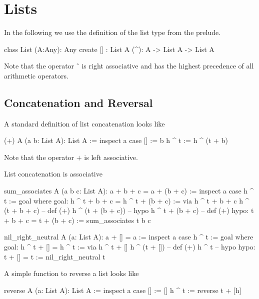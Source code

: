 \newpage
\section{Lists}
\label{sec:certprog-lists}


In the following we use the definition of the list type from the prelude.

\begin{alba}
  class
    List (A:Any): Any
  create
    [] : List A
    (^): A -> List A -> List A
\end{alba}
%
Note that the operator $\mathrel{\hat{\ }}$ is right associative and has the
highest precedence of all arithmetic operators.



\subsection{Concatenation and Reversal}


A standard definition of list concatenation looks like

\begin{alba}
  (+) A (a b: List A): List A :=
    inspect a case
      [] :=
        b
      h ^ t :=
        h ^ (t + b)
\end{alba}
Note that the operator $+$ is left associative.


List concatenation is associative
%
\begin{alba}
  sum_associates A (a b c: List A): a + b + c = a + (b + c) :=
    inspect a case
      h ^ t :=
        goal where
          goal: h ^ t + b + c = h ^ t + (b + c) :=
            via
               h ^ t + b + c
               h ^ (t + b + c)      -- def (+)
               h ^ (t + (b + c))    -- hypo
               h ^ t + (b + c)      -- def (+)
          hypo: t + b + c = t + (b + c) :=
            sum_associates t b c
\end{alba}


\begin{alba}
  nil_right_neutral A (a: List A): a + [] = a :=
    inspect a case
      h ^ t :=
        goal where
          goal: h ^ t + [] = h ^ t :=
            via
              h ^ t + []
              h ^ (t + [])   -- def (+)
              h ^ t          -- hypo
          hypo: t + [] = t :=
            nil_right_neutral t
\end{alba}


A simple function to reverse a list looks like

\begin{alba}
  reverse A (a: List A): List A :=
    inspect a case
      [] :=
        []
      h ^ t :=
        reverse t + [h]
\end{alba}



